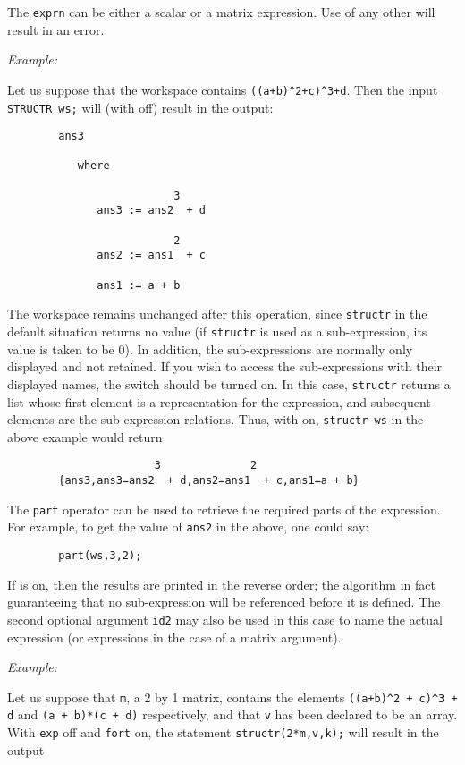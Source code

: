 The \texttt{exprn} can be either a scalar or a matrix expression.  Use of any
other will result in an error.

\textit{Example:}

Let us suppose that the workspace contains
\texttt{((a+b)\textasciicircum2+c)\textasciicircum3+d}.
Then the input \texttt{STRUCTR ws;} will (with  off) result in the
output:
\begin{verbatim}
        ans3

           where

                          3
              ans3 := ans2  + d

                          2
              ans2 := ans1  + c

              ans1 := a + b
\end{verbatim}
\hypertarget{switch:SAVESTRUCTR}{}
The workspace remains unchanged after this operation, since \texttt{structr}
in the default situation returns
no value (if \texttt{structr} is used as a sub-expression, its value is taken
to be 0).  In addition, the sub-expressions are normally only displayed
and not retained. If you wish to access the sub-expressions with their
displayed names, the switch  should be
turned on.  In this case, \texttt{structr} returns a list whose first element
is a representation for the expression, and subsequent elements are the
sub-expression relations.  Thus, with  on, \texttt{structr ws}
in the above example would return
\begin{verbatim}
                       3              2
        {ans3,ans3=ans2  + d,ans2=ans1  + c,ans1=a + b}
\end{verbatim}
The \texttt{part} operator can
be used to retrieve the required parts of the expression.  For example, to
get the value of \texttt{ans2} in the above, one could say:
\begin{verbatim}
        part(ws,3,2);
\end{verbatim}
If  is on, then the results are printed in the reverse order; the
algorithm in fact guaranteeing that no sub-expression will be referenced
before it is defined.  The second optional argument \texttt{id2} may also be
used in this case to name the actual expression (or expressions in the
case of a matrix argument).

\textit{Example:}

Let us suppose that \texttt{m}, a 2 by 1 matrix, contains the elements
\texttt{((a+b)\textasciicircum2 + c)\textasciicircum3 + d} and \texttt{(a + b)*(c + d)} respectively,
and that \texttt{v} has been declared to be an array.  With \texttt{exp} off and
\texttt{fort} on, the statement \texttt{structr(2*m,v,k);} will result in the output

